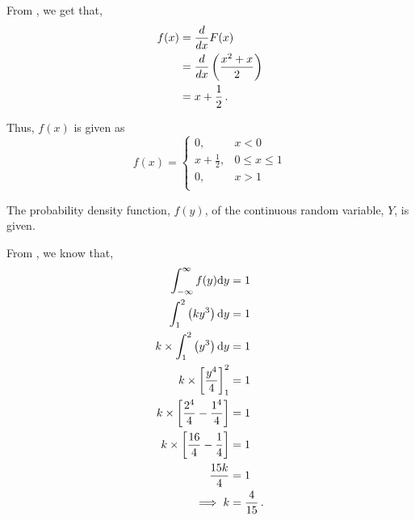 \begin{subquestions}
\begin{subsubquestions}

\subsubquestion

From , we get that,
\begin{align}
	f(x) & = \frac{d}{dx}F(x) \nonumber \\
	     & = \frac{d}{dx}\left(\frac{x^2+x}{2} \right) \nonumber \\
	     & = x + \frac{1}{2} \,.
\end{align}

Thus, $f(x)$ is given as
\[ f(x) = 
\begin{cases}
	0, & x<0 \\
	x + \frac{1}{2}, & 0 \leq  x \leq 1 \\
	0, & x>1 \\
\end{cases}
\]

\end{subsubquestions}	
	

\subquestion

The probability density function, $f(y)$, of the continuous random variable, $Y$, is given.

\begin{subsubquestions}
	
\subsubquestion

From , we know that,
\begin{align}
	\int_{-\infty}^{\infty} f(y)\mathrm{d}y & = 1 \nonumber \\
	\int_{1}^{2} \left(ky^3\right)\mathrm{d}y & = 1 \nonumber \\
	k \times \int_{1}^{2} \left(y^3\right)\mathrm{d}y & = 1 \nonumber \\
	k \times \left[\frac{y^4}{4} \right]^2_1 & = 1 \nonumber \\
	k \times \left[\frac{2^4}{4} - \frac{1^4}{4}\right] & = 1 \nonumber \\
	k \times \left[\frac{16}{4}- \frac{1}{4}\right] & = 1 \nonumber \\
	\frac{15k}{4} & = 1 \nonumber \\
	\implies k & = \frac{4}{15} \,.
\end{align}
	


\end{subsubquestions}
\end{subquestions}
